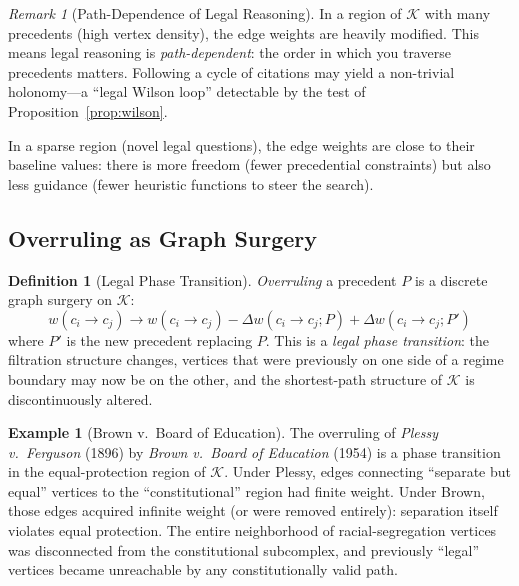 \documentclass[12pt]{article}
\theoremstyle{definition}
\newtheorem{definition}[theorem]{Definition}
\newtheorem{example}[theorem]{Example}
\theoremstyle{remark}
\newtheorem{remark}[theorem]{Remark}
\begin{document}
\begin{remark}[Path-Dependence of Legal Reasoning]
In a region of $\mathcal{K}$ with many precedents (high vertex density), the edge weights are heavily modified.  This means legal reasoning is \emph{path-dependent}: the order in which you traverse precedents matters.  Following a cycle of citations may yield a non-trivial holonomy---a ``legal Wilson loop'' detectable by the test of Proposition~\ref{prop:wilson}.

In a sparse region (novel legal questions), the edge weights are close to their baseline values: there is more freedom (fewer precedential constraints) but also less guidance (fewer heuristic functions to steer the search).
\end{remark}

\subsection{Overruling as Graph Surgery}

\begin{definition}[Legal Phase Transition]
\emph{Overruling} a precedent $P$ is a discrete graph surgery on $\mathcal{K}$:
\begin{equation}
w(c_i \to c_j) \to w(c_i \to c_j) - \Delta w(c_i \to c_j; P) + \Delta w(c_i \to c_j; P')
\label{eq:overrule}
\end{equation}
where $P'$ is the new precedent replacing $P$.  This is a \emph{legal phase transition}: the filtration structure changes, vertices that were previously on one side of a regime boundary may now be on the other, and the shortest-path structure of $\mathcal{K}$ is discontinuously altered.
\end{definition}

\begin{example}[Brown v.\ Board of Education]
The overruling of \emph{Plessy v.\ Ferguson} (1896) by \emph{Brown v.\ Board of Education} (1954) is a phase transition in the equal-protection region of $\mathcal{K}$.  Under Plessy, edges connecting ``separate but equal'' vertices to the ``constitutional'' region had finite weight.  Under Brown, those edges acquired infinite weight (or were removed entirely): separation itself violates equal protection.  The entire neighborhood of racial-segregation vertices was disconnected from the constitutional subcomplex, and previously ``legal'' vertices became unreachable by any constitutionally valid path.
\end{example}
\end{document}
